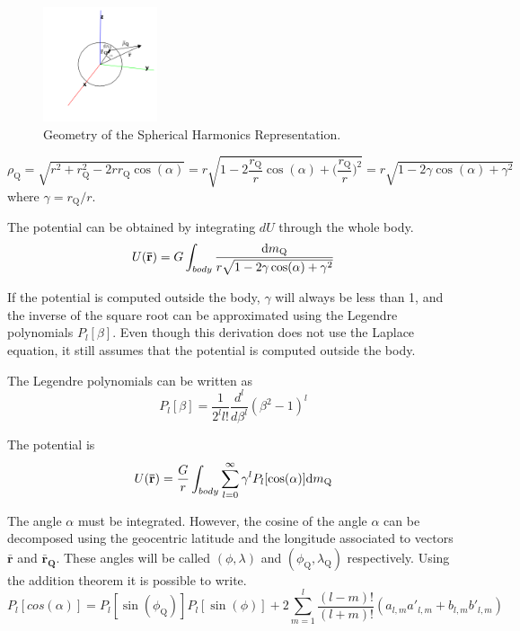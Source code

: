 \begin{figure}
	\centering
	\includegraphics[width=0.3\textwidth]{Figures/spherical_harmonics.png}
	\caption{Geometry of the Spherical Harmonics Representation.}\label{fig:spher_harm}
\end{figure}

\begin{equation}
\rho_\text{Q} = \sqrt{r^2 + r_\text{Q}^2 - 2 r r_\text{Q} \cos(\alpha)} = r \sqrt{1 - 2 \frac{r_\text{Q}}{r} \cos(\alpha) + \bigg(\frac{r_\text{Q}}{r}\bigg)^2} = r \sqrt{1 - 2 \gamma \cos(\alpha) + \gamma^2}
\end{equation}
where $\gamma = r_\text{Q}/r$.

The potential can be obtained by integrating $dU$ through the whole body.
\begin{equation}
U(\mathbf{\bar r}) = G \int_{body} \frac{\D m_\text{Q}}{r \sqrt{1 - 2 \gamma \cos(\alpha) + \gamma^2}}
\end{equation}

If the potential is computed outside the body, $\gamma$ will always be less than 1, and the inverse of the square root can be approximated using the Legendre polynomials $P_l[\beta]$\cite{vallado2013}. Even though this derivation does not use the Laplace equation, it still assumes that the potential is computed outside the body.

The Legendre polynomials can be written as
\begin{equation}
P_l[\beta] = \frac{1}{2^l l!} \frac{d^l}{d \beta^l} (\beta^2 - 1)^l
\end{equation}

The potential is
\begin{equation}
U(\mathbf{\bar r}) = \frac{G}{r} \int_{body} \sum_{l=0}^\infty \gamma^l P_l[\cos(\alpha)] \D m_\text{Q}
\end{equation}

The angle $\alpha$ must be integrated. However, the cosine of the angle $\alpha$ can be decomposed using the geocentric latitude and the longitude associated to vectors $\mathbf{\bar r}$ and $\mathbf{\bar r_\text{Q}}$. These angles will be called $(\phi, \lambda)$ and $(\phi_\text{Q}, \lambda_\text{Q})$ respectively. Using the addition theorem it is possible to write\cite{vallado2013}.
\begin{equation}
P_l[cos(\alpha)] = P_l[\sin(\phi_\text{Q})] P_l[\sin(\phi)] + 2 \sum_{m=1}^l \frac{(l-m)!}{(l+m)!} (a_{l,m} a'_{l,m} + b_{l,m} b'_{l,m})
\end{equation}

